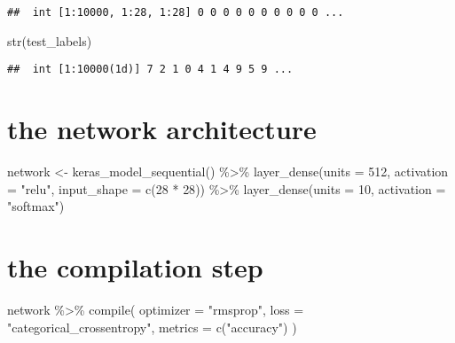 \documentclass[]{article}
\newenvironment{Shaded}{\begin{snugshade}}{\end{snugshade}}
\newcommand{\AttributeTok}[1]{\textcolor[rgb]{0.77,0.63,0.00}{#1}}
\newcommand{\DecValTok}[1]{\textcolor[rgb]{0.00,0.00,0.81}{#1}}
\newcommand{\FunctionTok}[1]{\textcolor[rgb]{0.00,0.00,0.00}{#1}}
\newcommand{\NormalTok}[1]{#1}
\newcommand{\OtherTok}[1]{\textcolor[rgb]{0.56,0.35,0.01}{#1}}
\newcommand{\SpecialCharTok}[1]{\textcolor[rgb]{0.00,0.00,0.00}{#1}}
\newcommand{\StringTok}[1]{\textcolor[rgb]{0.31,0.60,0.02}{#1}}
\begin{document}
\begin{verbatim}
##  int [1:10000, 1:28, 1:28] 0 0 0 0 0 0 0 0 0 0 ...
\end{verbatim}

\begin{Shaded}
\begin{Highlighting}[]
\FunctionTok{str}\NormalTok{(test\_labels)}
\end{Highlighting}
\end{Shaded}

\begin{verbatim}
##  int [1:10000(1d)] 7 2 1 0 4 1 4 9 5 9 ...
\end{verbatim}

\hypertarget{the-network-architecture}{%
\section{the network architecture}\label{the-network-architecture}}

\begin{Shaded}
\begin{Highlighting}[]
\NormalTok{network }\OtherTok{\textless{}{-}} \FunctionTok{keras\_model\_sequential}\NormalTok{() }\SpecialCharTok{\%\textgreater{}\%}
  \FunctionTok{layer\_dense}\NormalTok{(}\AttributeTok{units =} \DecValTok{512}\NormalTok{, }\AttributeTok{activation =} \StringTok{"relu"}\NormalTok{, }\AttributeTok{input\_shape =} \FunctionTok{c}\NormalTok{(}\DecValTok{28} \SpecialCharTok{*} \DecValTok{28}\NormalTok{)) }\SpecialCharTok{\%\textgreater{}\%}
  \FunctionTok{layer\_dense}\NormalTok{(}\AttributeTok{units =} \DecValTok{10}\NormalTok{, }\AttributeTok{activation =} \StringTok{"softmax"}\NormalTok{)}
\end{Highlighting}
\end{Shaded}

\hypertarget{the-compilation-step}{%
\section{the compilation step}\label{the-compilation-step}}

\begin{Shaded}
\begin{Highlighting}[]
\NormalTok{network }\SpecialCharTok{\%\textgreater{}\%} \FunctionTok{compile}\NormalTok{(}
  \AttributeTok{optimizer =} \StringTok{"rmsprop"}\NormalTok{,}
  \AttributeTok{loss =} \StringTok{"categorical\_crossentropy"}\NormalTok{,}
  \AttributeTok{metrics =} \FunctionTok{c}\NormalTok{(}\StringTok{"accuracy"}\NormalTok{)}
\NormalTok{)}
\end{Highlighting}
\end{Shaded}
\end{document}
